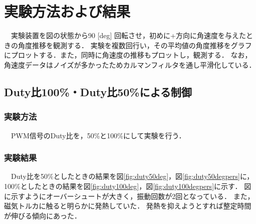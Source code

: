 \section{実験方法および結果}
　実験装置を図の状態から90 [deg] 回転させ，初めに+方向に角速度を与えたときの角度推移を観測する．
実験を複数回行い，その平均値の角度推移をグラフにプロットする．また，同時に角速度の推移もプロットし，観測する．
なお，角速度データはノイズが多かったためカルマンフィルタを通し平滑化している．
\subsection{Duty比100\%・Duty比50\%による制御}
\subsubsection{実験方法}
　PWM信号のDuty比を，50\%と100\%にして実験を行う．


\subsubsection{実験結果}
　Duty比を50\%としたときの結果を図\ref{fig:duty50deg}，図\ref{fig:duty50degpers}に，100\%としたときの結果を図\ref{fig:duty100deg}，図\ref{fig:duty100degpers}に示す．
図に示すようにオーバーシュートが大きく，振動回数が2回となっている．
また，磁気トルカに触ると明らかに発熱していた．
発熱を抑えようとすれば整定時間が伸びる傾向にあった．

